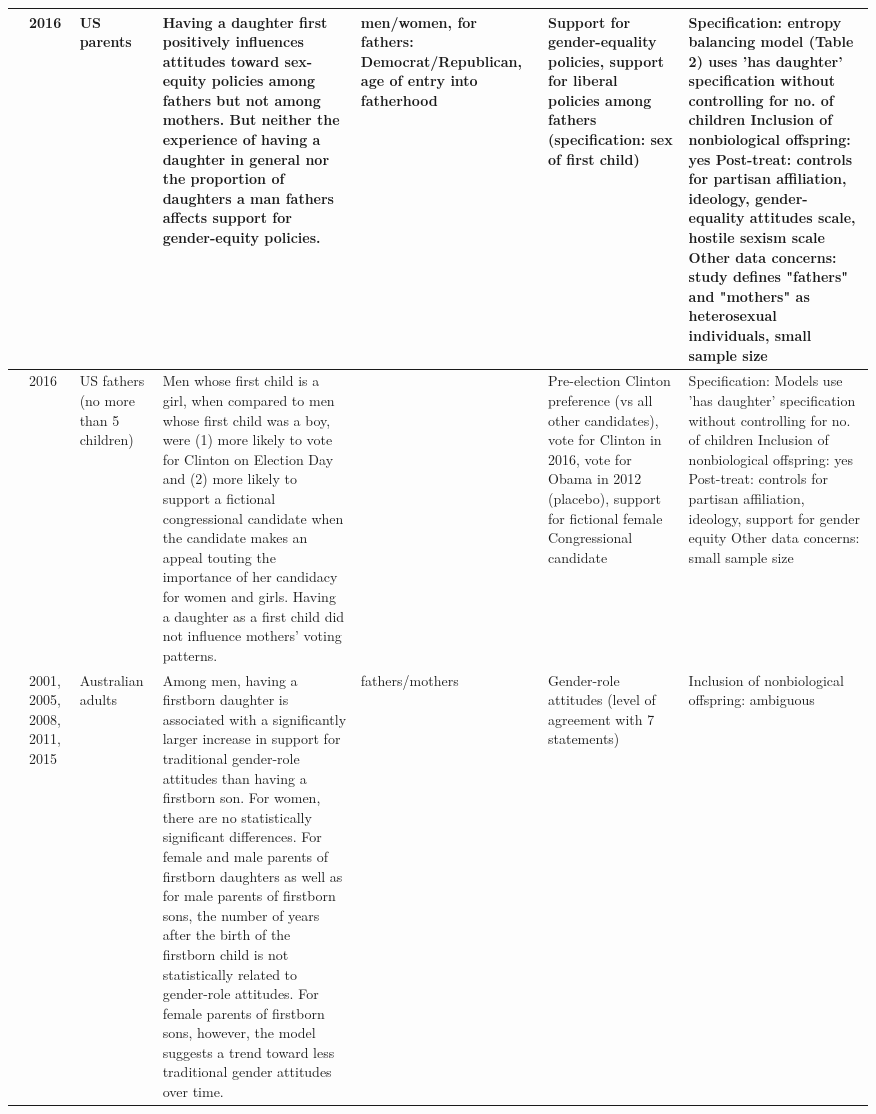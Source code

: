 \begin{longtable}{p{}p{}p{}p{}p{}p{}p{}}
   \midrule
\cite{sharrow2018first} & 2016 & US parents & Having a daughter first positively influences attitudes toward sex-equity policies among fathers but not among mothers. But neither the experience of having a daughter in general nor the proportion of daughters a man fathers affects support for gender-equity policies. & men/women, for fathers: Democrat/Republican, age of entry into fatherhood & Support for gender-equality policies, support for liberal policies among fathers (specification: sex of first child) & Specification: entropy balancing model (Table 2) uses 'has daughter' specification without controlling for no. of children
Inclusion of nonbiological offspring: yes
Post-treat: controls for partisan affiliation, ideology, gender-equality attitudes scale, hostile sexism scale
Other data concerns: study defines "fathers" and "mothers" as heterosexual individuals, small sample size \\ 
   \midrule
\cite{greenlee2020helping} & 2016 & US fathers (no more than 5 children) & Men whose first child is a girl, when compared to men whose first child was a boy, were (1) more likely to vote for Clinton on Election Day and (2) more likely to support a fictional congressional candidate when the candidate makes an appeal touting the importance of her candidacy for women and girls. Having a daughter as a first child did not influence mothers’ voting patterns. &  & Pre-election Clinton preference (vs all other candidates), vote for Clinton in 2016, vote for Obama in 2012 (placebo), support for fictional female Congressional candidate & Specification: Models use 'has daughter' specification without controlling for no. of children
Inclusion of nonbiological offspring: yes
Post-treat: controls for partisan affiliation, ideology, support for gender equity
Other data concerns: small sample size \\ 
   \midrule
\cite{perales2018men} & 2001, 2005, 2008, 2011, 2015 & Australian adults & Among men, having a firstborn daughter is associated with a significantly larger increase in support for traditional gender-role attitudes than having a firstborn son. For women, there are no statistically significant differences. For female and male parents of firstborn daughters as well as for male parents of firstborn sons, the number of years after the birth of the firstborn child is not statistically related to gender-role attitudes. For female parents of firstborn sons, however, the model suggests a trend toward less traditional gender attitudes over time. & fathers/mothers & Gender-role attitudes (level of agreement with 7 statements) & Inclusion of nonbiological offspring: ambiguous \\ 

\end{longtable}
